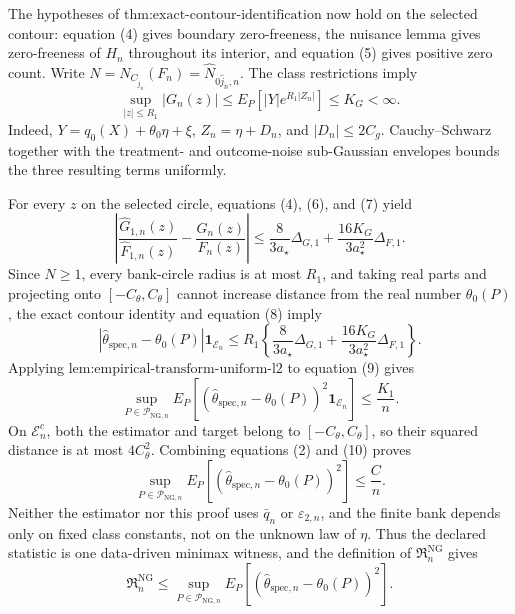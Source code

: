 The hypotheses of \(\text{thm:exact-contour-identification}\) now hold on the selected contour: equation (4) gives boundary zero-freeness, the nuisance lemma gives zero-freeness of \(H_n\) throughout its interior, and equation (5) gives positive zero count.  Write \(N=N_{C_{\widehat j_n}}(F_n)=\widehat N_{0\widehat j_n,n}\).  The class restrictions imply
\[
 \sup_{|z|\le R_1}|G_n(z)|
 \le E_P[|Y|e^{R_1|Z_n|}]
 \le K_G<\infty.                                        \tag{7}
\]
Indeed, \(Y=q_0(X)+\theta_0\eta+\xi\), \(Z_n=\eta+D_n\), and \(|D_n|\le2C_g\).  Cauchy--Schwarz together with the treatment- and outcome-noise sub-Gaussian envelopes bounds the three resulting terms uniformly.

For every \(z\) on the selected circle, equations (4), (6), and (7) yield
\[
 \left|
  \frac{\widehat G_{1,n}(z)}{\widehat F_{1,n}(z)}
  -\frac{G_n(z)}{F_n(z)}
 \right|
 \le
 \frac{8}{3a_{\star}}\Delta_{G,1}
 +\frac{16K_G}{3a_{\star}^2}\Delta_{F,1}.              \tag{8}
\]
Since \(N\ge1\), every bank-circle radius is at most \(R_1\), and taking real parts and projecting onto \([-C_{\theta},C_{\theta}]\) cannot increase distance from the real number \(\theta_0(P)\), the exact contour identity and equation (8) imply
\[
 |\widehat\theta_{\mathrm{spec},n}-\theta_0(P)|
 \mathbf 1_{\mathcal E_n}
 \le R_1\left\{
   \frac{8}{3a_{\star}}\Delta_{G,1}
   +\frac{16K_G}{3a_{\star}^2}\Delta_{F,1}
 \right\}.                                             \tag{9}
\]
Applying \(\text{lem:empirical-transform-uniform-l2}\) to equation (9) gives
\[
 \sup_{P\in\mathcal P_{\mathrm{NG},n}}
 E_P[(\widehat\theta_{\mathrm{spec},n}-\theta_0(P))^2
      \mathbf 1_{\mathcal E_n}]
 \le\frac{K_1}{n}.                                     \tag{10}
\]
On \(\mathcal E_n^c\), both the estimator and target belong to \([-C_{\theta},C_{\theta}]\), so their squared distance is at most \(4C_{\theta}^2\).  Combining equations (2) and (10) proves
\[
 \sup_{P\in\mathcal P_{\mathrm{NG},n}}
 E_P[(\widehat\theta_{\mathrm{spec},n}-\theta_0(P))^2]
 \le\frac Cn.                                          \tag{11}
\]
Neither the estimator nor this proof uses \(\bar q_n\) or \(\varepsilon_{2,n}\), and the finite bank depends only on fixed class constants, not on the unknown law of \(\eta\).  Thus the declared statistic is one data-driven minimax witness, and the definition of \(\mathfrak R_n^{\mathrm{NG}}\) gives
\[
 \mathfrak R_n^{\mathrm{NG}}
 \le
 \sup_{P\in\mathcal P_{\mathrm{NG},n}}
 E_P[(\widehat\theta_{\mathrm{spec},n}-\theta_0(P))^2]. \tag{12}
\]

